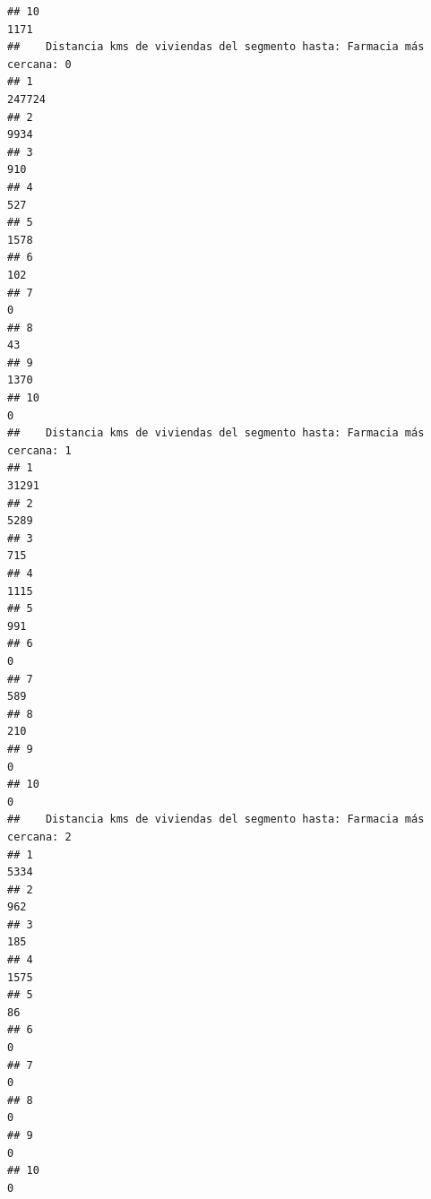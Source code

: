 \documentclass[11pt,]{article}
\begin{document}
\begin{verbatim}
## 10                                                                                      1171
##    Distancia kms de viviendas del segmento hasta: Farmacia más cercana: 0
## 1                                                                  247724
## 2                                                                    9934
## 3                                                                     910
## 4                                                                     527
## 5                                                                    1578
## 6                                                                     102
## 7                                                                       0
## 8                                                                      43
## 9                                                                    1370
## 10                                                                      0
##    Distancia kms de viviendas del segmento hasta: Farmacia más cercana: 1
## 1                                                                   31291
## 2                                                                    5289
## 3                                                                     715
## 4                                                                    1115
## 5                                                                     991
## 6                                                                       0
## 7                                                                     589
## 8                                                                     210
## 9                                                                       0
## 10                                                                      0
##    Distancia kms de viviendas del segmento hasta: Farmacia más cercana: 2
## 1                                                                    5334
## 2                                                                     962
## 3                                                                     185
## 4                                                                    1575
## 5                                                                      86
## 6                                                                       0
## 7                                                                       0
## 8                                                                       0
## 9                                                                       0
## 10                                                                      0

\end{verbatim}
\end{document}
